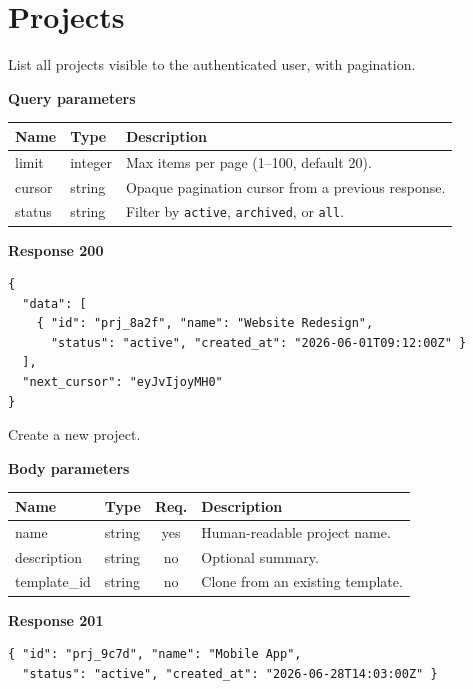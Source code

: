 \section{Projects}

\begin{apicard}{\quad{}}
List all projects visible to the authenticated user, with pagination.

\vspace{3pt}\textbf{Query parameters}

\begin{tabularx}{\linewidth}{@{}l l X@{}}
\toprule
\textbf{Name} & \textbf{Type} & \textbf{Description}\\
\midrule
\ttfamily limit  & integer & Max items per page (1--100, default 20).\\
\ttfamily cursor & string  & Opaque pagination cursor from a previous response.\\
\ttfamily status & string  & Filter by \texttt{active}, \texttt{archived}, or \texttt{all}.\\
\bottomrule
\end{tabularx}

\vspace{4pt}\textbf{Response 200}
\begin{lstlisting}
{
  "data": [
    { "id": "prj_8a2f", "name": "Website Redesign",
      "status": "active", "created_at": "2026-06-01T09:12:00Z" }
  ],
  "next_cursor": "eyJvIjoyMH0"
}
\end{lstlisting}
\end{apicard}

\vspace{6pt}
\begin{apicard}{\quad{}}
Create a new project.

\vspace{3pt}\textbf{Body parameters}

\begin{tabularx}{\linewidth}{@{}l l c X@{}}
\toprule
\textbf{Name} & \textbf{Type} & \textbf{Req.} & \textbf{Description}\\
\midrule
\ttfamily name        & string & yes & Human-readable project name.\\
\ttfamily description & string & no  & Optional summary.\\
\ttfamily template\_id & string & no  & Clone from an existing template.\\
\bottomrule
\end{tabularx}

\vspace{4pt}\textbf{Response 201}
\begin{lstlisting}
{ "id": "prj_9c7d", "name": "Mobile App",
  "status": "active", "created_at": "2026-06-28T14:03:00Z" }
\end{lstlisting}
\end{apicard}

